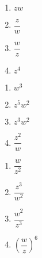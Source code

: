 \documentclass{ximera}
\begin{document}
\begin{multicols}{4}

\begin{enumerate}

\setcounter{enumi}{\value{HW}}

\item $zw$  \label{polarcomparithfirst}
\item $\dfrac{z}{w}$
\item $\dfrac{w}{z}$
\item $z^{4}$ 

\setcounter{HW}{\value{enumi}}

\end{enumerate}

\end{multicols}

\begin{multicols}{4} 

\begin{enumerate}

\setcounter{enumi}{\value{HW}}

\item $w^{3}$ 
\item $z^{5}w^{2}$ 
\item $z^{3}w^{2}$ 
\item $\dfrac{z^{2}}{w}$ 

\setcounter{HW}{\value{enumi}}

\end{enumerate}

\end{multicols}

\begin{multicols}{4} 

\begin{enumerate}

\setcounter{enumi}{\value{HW}}

\item $\dfrac{w}{z^2}$ 
\item $\dfrac{z^3}{w^2}$ 
\item $\dfrac{w^2}{z^3}$ 
\item $\left(\dfrac{w}{z}\right)^6$  \label{polarcomparithlast}

\setcounter{HW}{\value{enumi}}

\end{enumerate}

\end{multicols}
\end{document}

